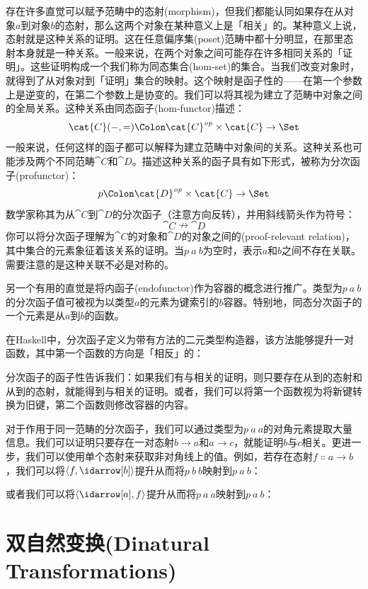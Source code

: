 
\lettrine[lhang=0.17]{存}{在许多直觉}可以赋予范畴中的态射(morphism)，但我们都能认同如果存在从对象$a$到对象$b$的态射，那么这两个对象在某种意义上是「相关」的。某种意义上说，态射就是这种关系的证明。这在任意偏序集(poset)范畴中都十分明显，在那里态射本身就是一种关系。一般来说，在两个对象之间可能存在许多相同关系的「证明」。这些证明构成一个我们称为同态集合(hom-set)的集合。当我们改变对象时，就得到了从对象对到「证明」集合的映射。这个映射是函子性的——在第一个参数上是逆变的，在第二个参数上是协变的。我们可以将其视为建立了范畴中对象之间的全局关系。这种关系由同态函子(hom-functor)描述：
$$\cat{C}(-, =) \Colon \cat{C}^\mathit{op}\times{}\cat{C} \to \Set$$
一般来说，任何这样的函子都可以解释为建立范畴中对象间的关系。这种关系也可能涉及两个不同范畴$\cat{C}$和$\cat{D}$。描述这种关系的函子具有如下形式，被称为分次函子(profunctor)：
$$p \Colon \cat{D}^\mathit{op}\times{}\cat{C} \to \Set$$
数学家称其为从$\cat{C}$到$\cat{D}$的分次函子（注意方向反转），并用斜线箭头作为符号：
$$\cat{C} \nrightarrow \cat{D}$$
你可以将分次函子理解为$\cat{C}$的对象和$\cat{D}$的对象之间的(proof-relevant relation)，其中集合的元素象征着该关系的证明。当$p\ a\ b$为空时，表示$a$和$b$之间不存在关联。需要注意的是这种关联不必是对称的。

另一个有用的直觉是将内函子(endofunctor)作为容器的概念进行推广。类型为$p\ a\ b$的分次函子值可被视为以类型$a$的元素为键索引的$b$容器。特别地，同态分次函子的一个元素是从$a$到$b$的函数。

在Haskell中，分次函子定义为带有方法的二元类型构造器，该方法能够提升一对函数，其中第一个函数的方向是「相反」的：

分次函子的函子性告诉我们：如果我们有与相关的证明，则只要存在从到的态射和从到的态射，就能得到与相关的证明。或者，我们可以将第一个函数视为将新键转换为旧键，第二个函数则修改容器的内容。

对于作用于同一范畴的分次函子，我们可以通过类型为$p\ a\ a$的对角元素提取大量信息。我们可以证明只要存在一对态射$b \to a$和$a \to c$，就能证明$b$与$c$相关。更进一步，我们可以使用单个态射来获取非对角线上的值。例如，若存在态射$f \Colon a \to b$，我们可以将$\langle f, \idarrow[b] \rangle$提升从而将$p\ b\ b$映射到$p\ a\ b$：

或者我们可以将$\langle \idarrow[a], f \rangle$提升从而将$p\ a\ a$映射到$p\ a\ b$：


\section{双自然变换(Dinatural Transformations)}

